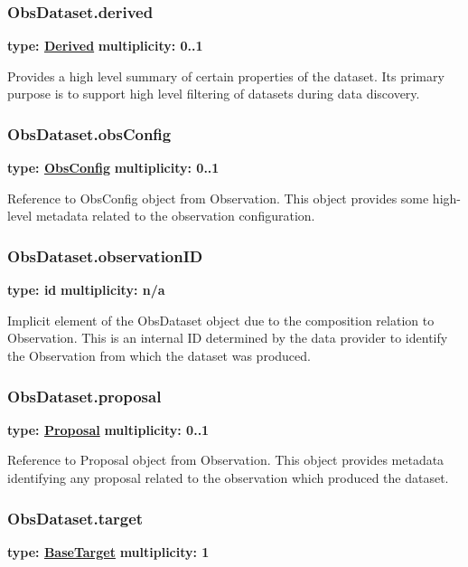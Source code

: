   \subsubsection{ObsDataset.derived}
  \textbf{type: \hyperref[sect:derived]{Derived}} \newline
  \textbf{multiplicity: 0..1} \newline

  Provides a high level summary of certain properties of the dataset. Its
  primary purpose is to support high level filtering of datasets during data
  discovery.
  
  \subsubsection{ObsDataset.obsConfig}
  \textbf{type: \hyperref[sect:obsconfig]{ObsConfig}} \newline
  \textbf{multiplicity: 0..1} \newline

  Reference to ObsConfig object from Observation. This object provides some
  high-level metadata related to the observation configuration.
  
  \subsubsection{ObsDataset.observationID}
  \textbf{type: id} \newline
  \textbf{multiplicity: n/a} \newline

  Implicit element of the ObsDataset object due to the composition relation to
  Observation. This is an internal ID determined by the data provider to
  identify the Observation from which the dataset was produced.
  
  \subsubsection{ObsDataset.proposal}
  \textbf{type: \hyperref[sect:proposal]{Proposal}} \newline
  \textbf{multiplicity: 0..1} \newline

  Reference to Proposal object from Observation. This object provides metadata
  identifying any proposal related to the observation which produced the dataset.  
  
  \subsubsection{ObsDataset.target}
  \textbf{type: \hyperref[sect:basetarget]{BaseTarget}} \newline
  \textbf{multiplicity: 1} \newline
  

